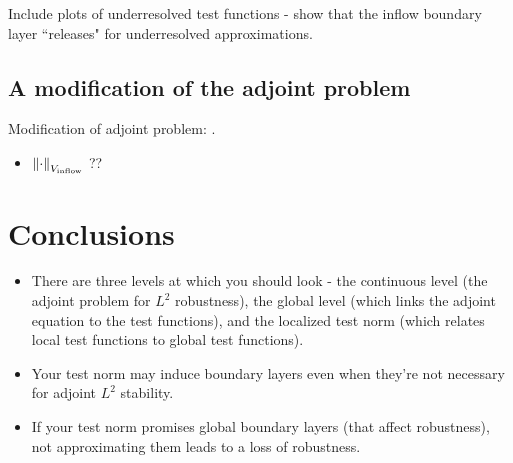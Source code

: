 \documentclass[11pt,onecolumn]{scrartcl}
\newcommand{\nor}[1]{\left\| #1 \right\|}
\newcommand{\LRp}[1]{\left( #1 \right)}
\newcommand{\LRa}[1]{\left\langle #1 \right\rangle}
\newcommand{\Grad} {\ensuremath{\nabla}}
\newcommand{\uh}{\widehat{u}}
\newcommand{\fnh}{\widehat{f}_n}
\newcommand{\grad}{\nabla}
\renewcommand{\div}{\grad \cdot}
\begin{document}
Include plots of underresolved test functions - show that the inflow boundary layer ``releases" for underresolved approximations.


\subsection{A modification of the adjoint problem}

Modification of adjoint problem: \cite{ChanHeuerBui-ThanhDemkowicz12}.
\begin{itemize}
\item $\nor{\cdot}_{V_{\rm inflow}}$ ??
\end{itemize}


\section{Conclusions}

\begin{itemize}
\item There are three levels at which you should look - the continuous level (the adjoint problem for $L^2$ robustness), the global level (which links the adjoint equation to the test functions), and the localized test norm (which relates local test functions to global test functions). 
\item Your test norm may induce boundary layers even when they're not necessary for adjoint $L^2$ stability.
\item If your test norm promises global boundary layers (that affect robustness), not approximating them leads to a loss of robustness. 
\end{itemize}
\end{document}
